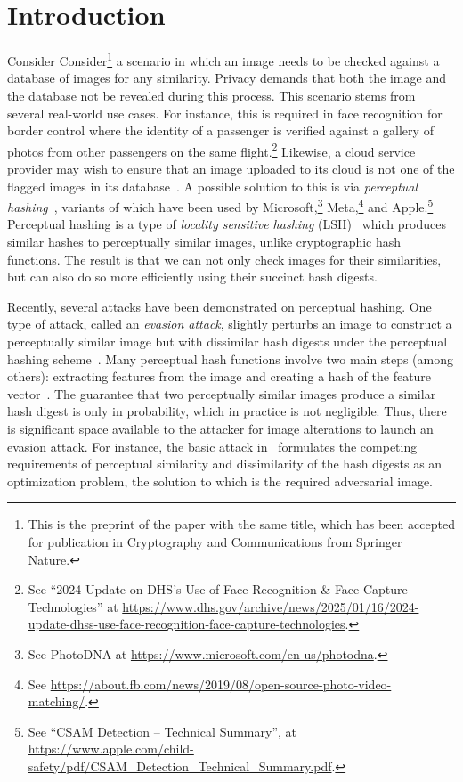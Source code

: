\documentclass[pdflatex,sn-mathphys-num]{sn-jnl}
\theoremstyle{definition}
\newcommand*{\has}[1]{{\textcolor{red}{[#1 ---hassan]}}}
\begin{document}
\section{Introduction}
\label{sec:Intro}
\ifisfullpaper
Consider
\else
Consider\footnote{This is the preprint of the paper with the same title, which has been accepted for publication in Cryptography and Communications from Springer Nature.}
\fi
a scenario in which an image needs to be checked against a database of images for any similarity. Privacy demands that both the image and the database not be revealed during this process. This scenario stems from several real-world use cases. For instance, this is required in face recognition for border control where the identity of a passenger is verified against a gallery of photos from other passengers on the same flight.\footnote{See ``2024 Update on DHS’s Use of Face Recognition \& Face Capture Technologies'' at \url{https://www.dhs.gov/archive/news/2025/01/16/2024-update-dhss-use-face-recognition-face-capture-technologies}.} Likewise, a cloud service provider may wish to ensure that an image uploaded to its cloud is not one of the flagged images in its database~\cite{struppek2022neuralhashbreak}. A possible solution to this is via \emph{perceptual hashing}~\cite{klinger2013phash, hao2021pph-attack, struppek2022neuralhashbreak}, variants of which have been used by Microsoft,\footnote{See PhotoDNA at \url{https://www.microsoft.com/en-us/photodna}.} Meta,\footnote{See \url{https://about.fb.com/news/2019/08/open-source-photo-video-matching/}.} and Apple.\footnote{See ``CSAM Detection -- Technical Summary'', at \url{https://www.apple.com/child-safety/pdf/CSAM_Detection_Technical_Summary.pdf}.} Perceptual hashing is a type of \emph{locality sensitive hashing} (LSH)~\cite{indyk1998ann} which produces similar hashes to perceptually similar images, unlike cryptographic hash functions. The result is that we can not only check images for their similarities, but can also do so more efficiently using their succinct hash digests. 

Recently, several attacks have been demonstrated on perceptual hashing. One type of attack, called an \emph{evasion attack}, 
slightly perturbs an image to construct a perceptually similar image but with dissimilar hash digests under the perceptual hashing scheme~\cite{struppek2022neuralhashbreak, hao2021pph-attack}. Many perceptual hash functions involve two main steps (among others): extracting features from the image and creating a hash of the feature vector~\cite{hao2021pph-attack}. The guarantee that two perceptually similar images produce a similar hash digest is only in probability, which in practice is not negligible. Thus, there is significant space available to the attacker for image alterations to launch an evasion attack. For instance, the basic attack in~\cite{hao2021pph-attack} formulates the competing requirements of perceptual similarity and dissimilarity of the hash digests as an optimization problem, the solution to which is the required adversarial image. 
\end{document}
